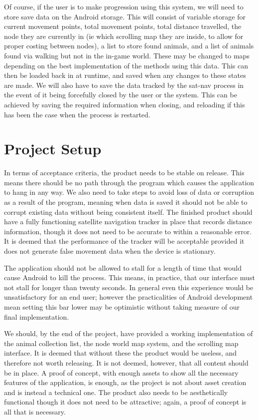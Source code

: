 \documentclass[12pt,a4paper,twoside]{article}
\begin{document}
Of course, if the user is to make progression using this system, we will need to store save data on the Android storage.
This will consist of variable storage for current movement points, total movement points, total distance travelled, the node they are currently in (ie which scrolling map they are inside, to allow for proper costing between nodes), a list to store found animals, and a list of animals found via walking but not in the in-game world.
These may be changed to maps depending on the best implementation of the methods using this data.
This can then be loaded back in at runtime, and saved when any changes to these states are made.
We will also have to save the data tracked by the sat-nav process in the event of it being forcefully closed by the user or the system.
This can be achieved by saving the required information when closing, and reloading if this has been the case when the process is restarted.

\section{Project Setup}
In terms of acceptance criteria, the product needs to be stable on release.
This means there should be no path through the program which causes the application to hang in any way.
We also need to take steps to avoid loss of data or corruption as a result of the program, meaning when data is saved it should not be able to corrupt existing data without being consistent itself.
The finished product should have a fully functioning satellite navigation tracker in place that records distance information, though it does not need to be accurate to within a reasonable error.
It is deemed that the performance of the tracker will be acceptable provided it does not generate false movement data when the device is stationary.


The application should not be allowed to stall for a length of time that would cause Android to kill the process.
This means, in practice, that our interface must not stall for longer than twenty seconds.
In general even this experience would be unsatisfactory for an end user; however the practicalities of Android development mean setting this bar lower may be optimistic without taking measure of our final implementation.

We should, by the end of the project, have provided a working implementation of the animal collection list, the node world map system, and the scrolling map interface.
It is deemed that without these the product would be useless, and therefore not worth releasing.
It is not deemed, however, that all content should be in place.
A proof of concept, with enough assets to show all the necessary features of the application, is enough, as the project is not about asset creation and is instead a technical one.
The product also needs to be aesthetically functional though it does not need to be attractive; again, a proof of concept is all that is necessary.
\end{document}
